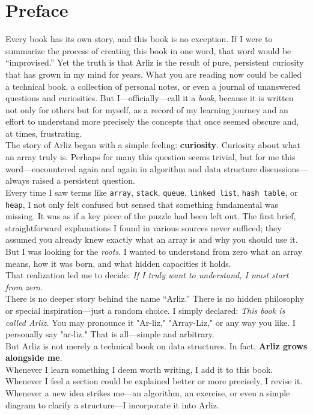 \chapter{Preface}

Every book has its own story, and this book is no exception. If I were to summarize the process of creating this book in one word, that word would be “improvised.” Yet the truth is that Arliz is the result of pure, persistent curiosity that has grown in my mind for years. What you are reading now could be called a technical book, a collection of personal notes, or even a journal of unanswered questions and curiosities. But I—officially—call it a \emph{book}, because it is written not only for others but for myself, as a record of my learning journey and an effort to understand more precisely the concepts that once seemed obscure and, at times, frustrating.\\
The story of Arliz began with a simple feeling: \textbf{curiosity}.  
Curiosity about what an array truly is. Perhaps for many this question seems trivial, but for me this word—encountered again and again in algorithm and data structure discussions—always raised a persistent question.\\
Every time I saw terms like \texttt{array}, \texttt{stack}, \texttt{queue}, \texttt{linked list}, \texttt{hash table}, or \texttt{heap}, I not only felt confused but sensed that something fundamental was missing. It was as if a key piece of the puzzle had been left out. The first brief, straightforward explanations I found in various sources never sufficed; they assumed you already knew exactly what an array is and why you should use it. But I was looking for the \emph{roots}. I wanted to understand from zero what an array means, how it was born, and what hidden capacities it holds.\\
That realization led me to decide:  
\emph{If I truly want to understand, I must start from zero.}\\	
There is no deeper story behind the name “Arliz.” There is no hidden philosophy or special inspiration—just a random choice. I simply declared:  
\emph{This book is called Arliz.}  
You may pronounce it "Ar-liz," "Array-Liz," or any way you like. I personally say "ar-liz." That is all—simple and arbitrary.\\	
But Arliz is not merely a technical book on data structures. In fact, \textbf{Arliz grows alongside me}. \\
Whenever I learn something I deem worth writing, I add it to this book. Whenever I feel a section could be explained better or more precisely, I revise it. Whenever a new idea strikes me—an algorithm, an exercise, or even a simple diagram to clarify a structure—I incorporate it into Arliz.\\
